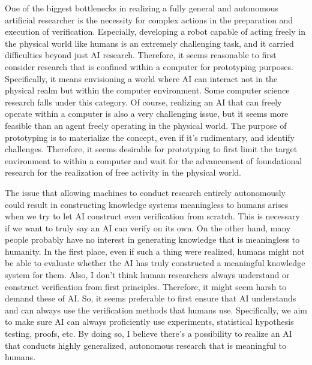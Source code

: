One of the biggest bottlenecks in realizing a fully general and autonomous artificial researcher is the necessity for complex actions in the preparation and execution of verification. Especially, developing a robot capable of acting freely in the physical world like humans is an extremely challenging task, and it carried difficulties beyond just AI research. Therefore, it seems reasonable to first consider research that is confined within a computer for prototyping purposes. Specifically, it means envisioning a world where AI can interact not in the physical realm but within the computer environment. Some computer science research falls under this category. Of course, realizing an AI that can freely operate within a computer is also a very challenging issue, but it seems more feasible than an agent freely operating in the physical world. The purpose of prototyping is to materialize the concept, even if it's rudimentary, and identify challenges. Therefore, it seems desirable for prototyping to first limit the target environment to within a computer and wait for the advancement of foundational research for the realization of free activity in the physical world.

The issue that allowing machines to conduct research entirely autonomously could result in constructing knowledge systems meaningless to humans arises when we try to let AI construct even verification from scratch. This is necessary if we want to truly say an AI can verify on its own. On the other hand, many people probably have no interest in generating knowledge that is meaningless to humanity. In the first place, even if such a thing were realized, humans might not be able to evaluate whether the AI has truly constructed a meaningful knowledge system for them. Also, I don't think human researchers always understand or construct verification from first principles. Therefore, it might seem harsh to demand these of AI. So, it seems preferable to first ensure that AI understands and can always use the verification methods that humans use. Specifically, we aim to make sure AI can always proficiently use experiments, statistical hypothesis testing, proofs, etc. By doing so, I believe there's a possibility to realize an AI that conducts highly generalized, autonomous research that is meaningful to humans.

